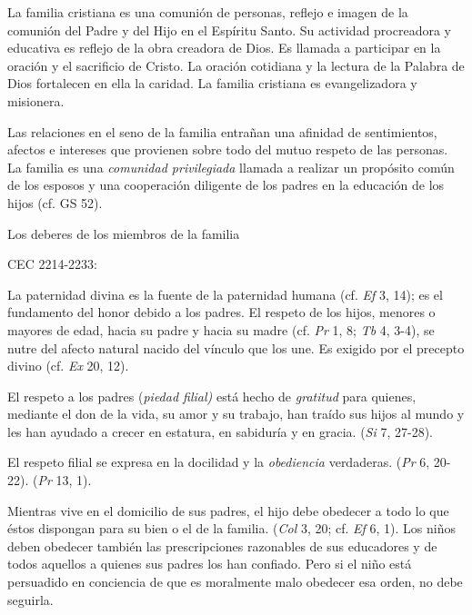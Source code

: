 	 La familia cristiana es una comunión de personas, reflejo e imagen de la comunión del Padre y del Hijo en el Espíritu Santo. Su actividad procreadora y educativa es reflejo de la obra creadora de Dios. Es llamada a participar en la oración y el sacrificio de Cristo. La oración cotidiana y la lectura de la Palabra de Dios fortalecen en ella la caridad. La familia cristiana es evangelizadora y misionera.
	
	 Las relaciones en el seno de la familia entrañan una afinidad de sentimientos, afectos e intereses que provienen sobre todo del mutuo respeto de las personas. La familia es una \emph{comunidad privilegiada} llamada a realizar un propósito común de los esposos y una cooperación diligente de los padres en la educación de los hijos (cf. GS 52).
	
	Los deberes de los miembros de la familia
	
	CEC 2214-2233:
	
	
	 La paternidad divina es la fuente de la paternidad humana (cf. \emph{Ef} 3, 14); es el fundamento del honor debido a los padres. El respeto de los hijos, menores o mayores de edad, hacia su padre y hacia su madre (cf. \emph{Pr} 1, 8; \emph{Tb} 4, 3-4), se nutre del afecto natural nacido del vínculo que los une. Es exigido por el precepto divino (cf. \emph{Ex} 20, 12).
	
	 El respeto a los padres (\emph{piedad filial)} está hecho de \emph{gratitud} para quienes, mediante el don de la vida, su amor y su trabajo, han traído sus hijos al mundo y les han ayudado a crecer en estatura, en sabiduría y en gracia.  (\emph{Si} 7, 27-28).
	
	 El respeto filial se expresa en la docilidad y la \emph{obediencia} verdaderas.  (\emph{Pr} 6, 20-22).  (\emph{Pr} 13, 1).
	
	 Mientras vive en el domicilio de sus padres, el hijo debe obedecer a todo lo que éstos dispongan para su bien o el de la familia.  (\emph{Col} 3, 20; cf. \emph{Ef} 6, 1). Los niños deben obedecer también las prescripciones razonables de sus educadores y de todos aquellos a quienes sus padres los han confiado. Pero si el niño está persuadido en conciencia de que es moralmente malo obedecer esa orden, no debe seguirla.
	
